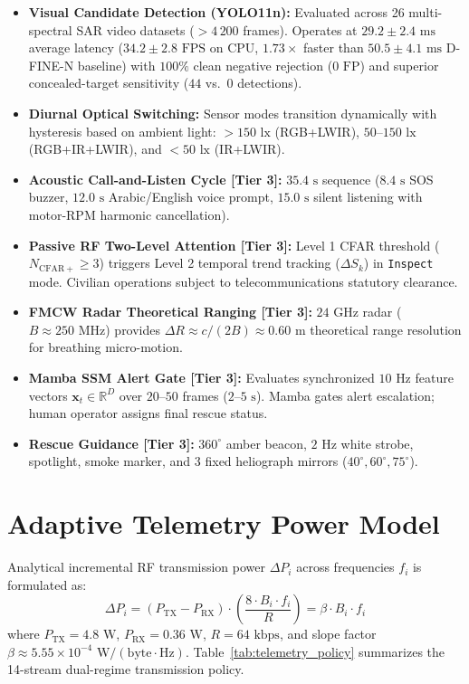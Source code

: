 \documentclass[conference]{IEEEtran}
\begin{document}
\begin{itemize}
    \item \textbf{Visual Candidate Detection (YOLO11n):} Evaluated across 26 multi-spectral SAR video datasets ($>4\,200$ frames). Operates at $29.2 \pm 2.4\text{ ms}$ average latency ($34.2 \pm 2.8\text{ FPS}$ on CPU, $1.73\times$ faster than $50.5 \pm 4.1\text{ ms}$ D-FINE-N baseline) with $100\%$ clean negative rejection ($0\text{ FP}$) and superior concealed-target sensitivity ($44$ vs.\ $0$ detections).
    \item \textbf{Diurnal Optical Switching:} Sensor modes transition dynamically with hysteresis based on ambient light: $>150\text{ lx}$ (RGB+LWIR), $50\text{--}150\text{ lx}$ (RGB+IR+LWIR), and $<50\text{ lx}$ (IR+LWIR).
    \item \textbf{Acoustic Call-and-Listen Cycle [Tier 3]:} $35.4\text{ s}$ sequence ($8.4\text{ s}$ SOS buzzer, $12.0\text{ s}$ Arabic/English voice prompt, $15.0\text{ s}$ silent listening with motor-RPM harmonic cancellation).
    \item \textbf{Passive RF Two-Level Attention [Tier 3]:} Level 1 CFAR threshold ($N_{\mathrm{CFAR+}} \ge 3$) triggers Level 2 temporal trend tracking ($\Delta S_k$) in \texttt{Inspect} mode. Civilian operations subject to telecommunications statutory clearance.
    \item \textbf{FMCW Radar Theoretical Ranging [Tier 3]:} $24\text{ GHz}$ radar ($B \approx 250\text{ MHz}$) provides $\Delta R \approx c/(2B) \approx 0.60\text{ m}$ theoretical range resolution for breathing micro-motion.
    \item \textbf{Mamba SSM Alert Gate [Tier 3]:} Evaluates synchronized $10\text{ Hz}$ feature vectors $\mathbf{x}_t \in \mathbb{R}^D$ over $20\text{--}50$ frames ($2\text{--}5\text{ s}$). Mamba gates alert escalation; human operator assigns final rescue status.
    \item \textbf{Rescue Guidance [Tier 3]:} $360^\circ$ amber beacon, $2\text{ Hz}$ white strobe, spotlight, smoke marker, and 3 fixed heliograph mirrors ($40^\circ, 60^\circ, 75^\circ$).
\end{itemize}

\section{Adaptive Telemetry Power Model}
Analytical incremental RF transmission power $\Delta P_i$ across frequencies $f_i$ is formulated as:
\begin{equation}
\Delta P_i = (P_{\mathrm{TX}} - P_{\mathrm{RX}}) \cdot \left(\frac{8 \cdot B_i \cdot f_i}{R}\right) = \beta \cdot B_i \cdot f_i
\end{equation}
where $P_{\mathrm{TX}} = 4.8\text{ W}$, $P_{\mathrm{RX}} = 0.36\text{ W}$, $R = 64\text{ kbps}$, and slope factor $\beta \approx 5.55 \times 10^{-4}\text{ W}/(\text{byte}\cdot\text{Hz})$. Table~\ref{tab:telemetry_policy} summarizes the 14-stream dual-regime transmission policy.
\end{document}
